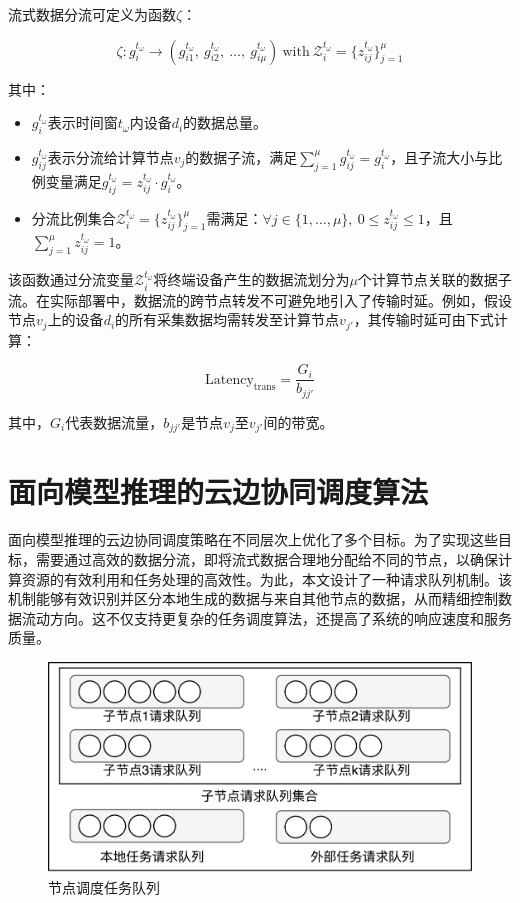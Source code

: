 \begin{definition}[流式数据分流函数]
流式数据分流可定义为函数$\zeta$：
\end{definition}

$$
\zeta: g_i^{t_\omega} \to \left( g_{i1}^{t_\omega},\ g_{i2}^{t_\omega},\ \dots,\ g_{i\mu}^{t_\omega} \right) \ \text{with} \ \mathcal{Z}_i^{t_\omega} = \{z_{ij}^{t_\omega}\}_{j=1}^\mu
$$

其中：
\begin{itemize}
    \item $g_i^{t_\omega}$表示时间窗$t_\omega$内设备$d_i$的数据总量。
    \item $g_{ij}^{t_\omega}$表示分流给计算节点$v_j$的数据子流，满足$\sum\limits_{j=1}^\mu g_{ij}^{t_\omega} = g_i^{t_\omega}$，且子流大小与比例变量满足$g_{ij}^{t_\omega} = z_{ij}^{t_\omega} \cdot g_i^{t_\omega}$。
    \item 分流比例集合$\mathcal{Z}_i^{t_\omega} = \{z_{ij}^{t_\omega}\}_{j=1}^\mu$需满足：$\forall j \in \{1,\dots,\mu\},\ 0 \leq z_{ij}^{t_\omega} \leq 1$，且$\sum\limits_{j=1}^\mu z_{ij}^{t_\omega} = 1$。
\end{itemize}

该函数通过分流变量$\mathcal{Z}_i^{t_\omega}$将终端设备产生的数据流划分为$\mu$个计算节点关联的数据子流。在实际部署中，数据流的跨节点转发不可避免地引入了传输时延。例如，假设节点$v_j$上的设备$d_i$的所有采集数据均需转发至计算节点$v_{j'}$，其传输时延可由下式计算：

\begin{equation}
\text{Latency}_\text{trans}=\frac{G_i}{b_{jj'}}
\end{equation}

其中，\(G_i\)代表数据流量，$b_{jj'}$是节点$v_j$至$v_{j'}$间的带宽。

\section{面向模型推理的云边协同调度算法}

面向模型推理的云边协同调度策略在不同层次上优化了多个目标。为了实现这些目标，需要通过高效的数据分流，即将流式数据合理地分配给不同的节点，以确保计算资源的有效利用和任务处理的高效性。为此，本文设计了一种请求队列机制。该机制能够有效识别并区分本地生成的数据与来自其他节点的数据，从而精细控制数据流动方向。这不仅支持更复杂的任务调度算法，还提高了系统的响应速度和服务质量。

\begin{figure}[h]
  \centering
  \includegraphics[width=0.75\linewidth]{pics/3-11集群调度.png}
  \caption{节点调度任务队列}
  \label{fig:3-11cluster}
\end{figure}

